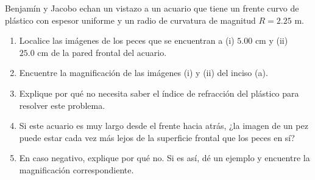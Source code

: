 \item Benjamín y Jacobo echan un vistazo a un acuario que tiene un frente curvo de plástico con espesor uniforme y un radio de curvatura de magnitud $R = 2.25\text{ m}$.
\begin{enumerate}
    \item Localice las imágenes de los peces que se encuentran a (i) $5.00\text{ cm}$ y (ii) $25.0\text{ cm}$ de la pared frontal del acuario.
    \item Encuentre la magnificación de las imágenes (i) y (ii) del inciso (a).
    \item Explique por qué no necesita saber el índice de refracción del plástico para resolver este problema.
    \item Si este acuario es muy largo desde el frente hacia atrás, ¿la imagen de un pez puede estar cada vez más lejos de la superficie frontal que los peces en sí?
    \item En caso negativo, explique por qué no. Si es así, dé un ejemplo y encuentre la magnificación correspondiente.
\end{enumerate}